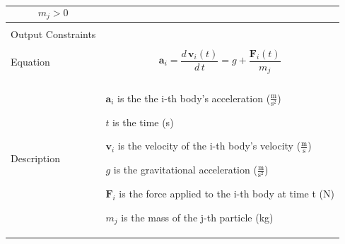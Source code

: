 \documentclass[12pt]{article}
\begin{document}
\begin{minipage}{\textwidth}
\begin{tabular}{p{} p{}}
                                             \begin{displaymath}
                                             {m_{j}}>0
                                             \end{displaymath}
                                             \\ \midrule \\
                                             Output Constraints & \\ \midrule \\
                                                                  Equation & \begin{displaymath}
                                                                             {\mathbf{a}_{i}}=\frac{d\,{\mathbf{v}_{i}}\left(t\right)}{d\,t}=g+\frac{{\mathbf{F}_{i}}\left(t\right)}{{m_{j}}}
                                                                             \end{displaymath}
                                                                             \\ \midrule \\
                                                                             Description & \begin{symbDescription}
                                                                                           \item{${\mathbf{a}_{i}}$ is the the i-th body's acceleration ($\frac{\text{m}}{\text{s}^{2}}$)}
                                                                                           \item{$t$ is the time (s)}
                                                                                           \item{${\mathbf{v}_{i}}$ is the velocity of the i-th body's velocity ($\frac{\text{m}}{\text{s}}$)}
                                                                                           \item{$g$ is the gravitational acceleration ($\frac{\text{m}}{\text{s}^{2}}$)}
                                                                                           \item{${\mathbf{F}_{i}}$ is the force applied to the i-th body at time t (N)}
                                                                                           \item{${m_{j}}$ is the mass of the j-th particle (kg)}
                                                                                           \end{symbDescription}

\end{tabular}
\end{minipage}
\end{document}
